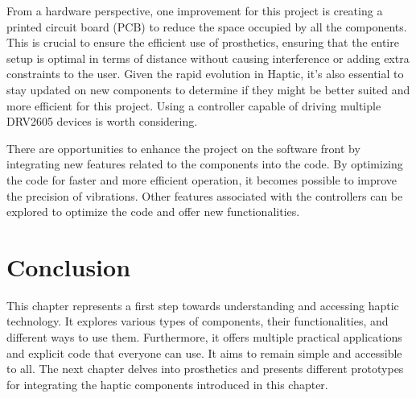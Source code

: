 From a hardware perspective, one improvement for this project is creating a printed circuit board (PCB) to reduce the space occupied by all the components. This is crucial to ensure the efficient use of prosthetics, ensuring that the entire setup is optimal in terms of distance without causing interference or adding extra constraints to the user. Given the rapid evolution in Haptic, it's also essential to stay updated on new components to determine if they might be better suited and more efficient for this project. Using a controller capable of driving multiple DRV2605 devices is worth considering.

There are opportunities to enhance the project on the software front by integrating new features related to the components into the code. By optimizing the code for faster and more efficient operation, it becomes possible to improve the precision of vibrations. Other features associated with the controllers can be explored to optimize the code and offer new functionalities.

\section{Conclusion}
This chapter represents a first step towards understanding and accessing haptic technology. It explores various types of components, their functionalities, and different ways to use them. Furthermore, it offers multiple practical applications and explicit code that everyone can use. It aims to remain simple and accessible to all. The next chapter delves into prosthetics and presents different prototypes for integrating the haptic components introduced in this chapter.